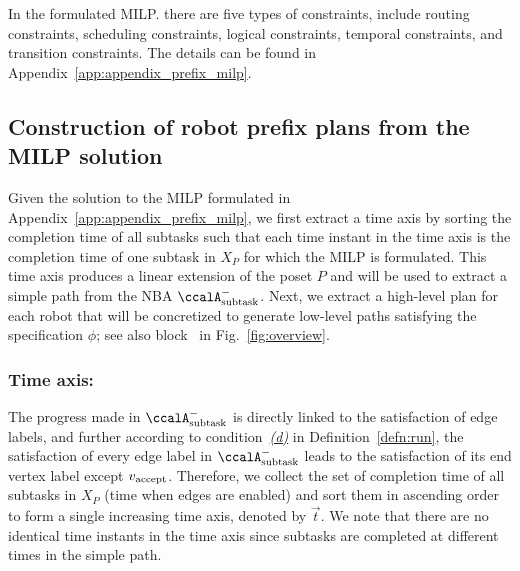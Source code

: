 \documentclass[Afour,sageh,times]{sagej}
\newcommand*\circled[1]{\tikz[baseline=(char.base)]{
            \node[shape=circle,draw,inner sep=1pt] (char) {#1};}}
\newcommand{\auto}[1]{\ccalA_{\textup{#1}}}
\newcommand{\vertex}[1]{v_{\textup{#1}}}
\newcommand{\node}[1]{V_{n}^{\text{#1}}}
\begin{document}
In the formulated MILP. there are five types of constraints, include routing constraints, scheduling constraints, logical constraints, temporal constraints, and transition constraints. The details can be found in Appendix~\ref{app:appendix_prefix_milp}.

{{
\subsection{Construction of robot prefix plans from the MILP solution}\label{sec:path}
Given the solution to the  MILP formulated in Appendix~\ref{app:appendix_prefix_milp}, we first extract a time axis by sorting the completion time of all subtasks such that each time instant in the time axis is the completion time of one subtask in $X_P$ for which the MILP is formulated. This time axis produces a linear extension of the poset $P$ and  will be used to extract a simple path from the NBA $\auto{subtask}^-$. Next, we extract a high-level plan for each robot  that will be concretized to generate low-level paths satisfying the specification $\phi$; see also block~\circled{5}  in Fig.~\ref{fig:overview}.


\subsubsection{Time axis:}\label{sec:timeaxis} The progress made in $\auto{subtask}^-$ is directly linked to the satisfaction of edge labels, and further according to condition~\hyperref[cond:d]{\it (d)} in Definition~\ref{defn:run}, the satisfaction of every edge label in $\auto{subtask}^-$ leads to the satisfaction of its end vertex label except $\vertex{accept}$. Therefore, we collect the set of completion time of all subtasks in $X_P$ (time when edges are enabled)
and  sort them in ascending order to form a single increasing time axis, denoted by $\vec{t}$. We note that there are no identical time instants in the time axis since subtasks are completed at different times in the simple path.



}}
\end{document}
